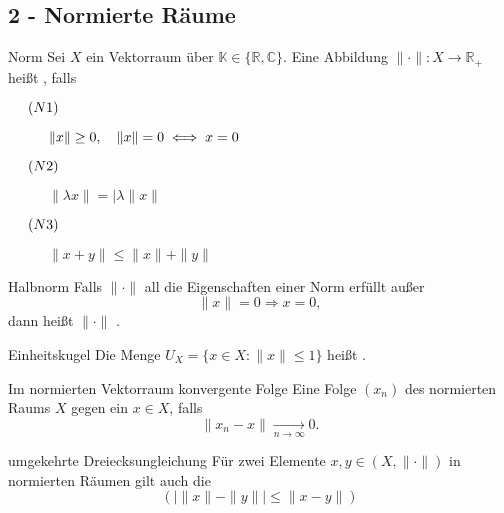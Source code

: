\subsection*{2 - Normierte Räume}

	\begin{karte}{Norm}
	Sei $X$ ein Vektorraum über $\mathbb{K} \in \{ \mathbb{R}, \mathbb{C} \}$. Eine Abbildung  $\| \cdot \| \colon X \rightarrow \mathbb{R}_{+}$ hei{\ss}t , falls
		\begin{description}
			\item[$\hspace{0.5cm} (N1) \hspace{0.1cm} $] $\| x \| \geq 0, \quad \| x \| = 0 \iff x = 0 $
			\item[$\hspace{0.5cm} (N2) \hspace{0.1cm} $] $\| \lambda x \| = | \lambda \| x \| $
			\item[$\hspace{0.5cm} (N3) \hspace{0.1cm} $] $\| x + y \| \leq \| x \| + \| y \| $
		\end{description}
	\end{karte}
	
	\begin{karte}{Halbnorm}
		Falls $ \| \cdot \| $ all die Eigenschaften einer Norm erfüllt au{\ss}er 
		\[ \| x \| = 0 \Rightarrow x = 0, \]
		dann hei{\ss}t $ \| \cdot \| $ .
	\end{karte}
	
	\begin{karte}{Einheitskugel}
		Die Menge $ U_{X} = \{ x \in X:  \|x \| \leq 1 \}$ hei{\ss}t .
	\end{karte}
	
	\begin{karte}{Im normierten Vektorraum konvergente Folge}
		Eine Folge $(x_{n})$ des normierten Raums $X$  gegen ein $ x \in X $, falls 
		\[ \| x_{n} - x \| \xrightarrow[n \rightarrow \infty]{} 0. \]
	\end{karte}
	
	\begin{karte}{umgekehrte Dreiecksungleichung}
		Für zwei Elemente $x, y \in (X, \| \cdot \|)$ in normierten Räumen gilt auch die  
		\[ ( \left| \| x \| - \| y \| \right| \leq \| x - y \|) \]
	\end{karte}
	
